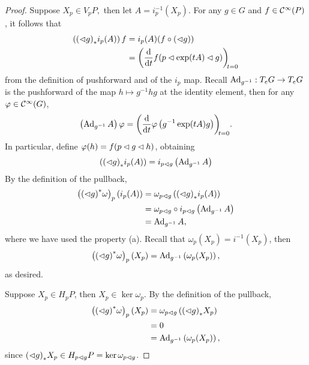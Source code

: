 \begin{proof}
    Suppose \(X_p \in V_pP,\) then let \(A = i^{-1}_p(X_p)\). For any \(g \in G\) and \(f \in \mathcal{C}^\infty(P)\), it follows that
    \begin{align*}
        \left(\pf{(\ract g)}{i_p(A)}\right)f &= i_p(A) (f \circ (\ract g))\\
                                             &= \diff*{f(p \ract \exp(tA) \ract g)}{t}[t=0]
    \end{align*}
    from the definition of pushforward and of the \(i_p\) map. Recall \(\operatorname{Ad}_{g^{-1}} : T_eG \to T_eG\) is the pushforward of the map \(h\mapsto g^{-1} h g\) at the identity element, then for any \(\varphi \in \mathcal{C}^\infty(G)\),
    \begin{equation*}
        \left(\Ad{g^{-1}}A\right)\varphi = \diff*{\varphi\left(g^{-1} \exp(tA) g\right)}{t}[t=0].
    \end{equation*}
    In particular, define \(\varphi(h) = f(p\mathbin{\vartriangleleft} g \mathbin{\vartriangleleft} h)\), obtaining
    \begin{equation*}
        \left({(\mathbin{\vartriangleleft} g)}_{\ast{}}{i_p(A)}\right) = i_{p \mathbin{\vartriangleleft} g}\left(\operatorname{Ad}_{g^{-1}}A\right)
    \end{equation*}
    By the definition of the pullback,
    \begin{align*}
        \left({(\mathbin{\vartriangleleft} g)}^{\ast}_{}{\omega}\right)_p \left(i_p(A)\right) &= \omega_{p\mathbin{\vartriangleleft} g}\left({(\mathbin{\vartriangleleft} g)}_{\ast{}}{i_p(A)}\right)\\
                                                                  &= \omega_{p\mathbin{\vartriangleleft} g} \circ i_{p\mathbin{\vartriangleleft} g}\left(\operatorname{Ad}_{g^{-1}}A\right)\\
                                                                  &= \operatorname{Ad}_{g^{-1}}A,
    \end{align*}
    where we have used the property (a). Recall that \(\omega_p(X_p) = i^{-1}(X_p)\), then
    \begin{equation*}
         \left({(\mathbin{\vartriangleleft} g)}^{\ast}_{}{\omega}\right)_p \left(X_p\right) = \operatorname{Ad}_{g^{-1}}\left(\omega_p(X_p)\right),
    \end{equation*}
    as desired.

    Suppose \(X_p \in H_pP\), then \(X_p \in \ker \omega_p\). By the definition of the pullback,
    \begin{align*}
        \left({(\mathbin{\vartriangleleft} g)}^{\ast}_{}{\omega}\right)_p \left(X_p\right) &= \omega_{p\mathbin{\vartriangleleft} g}\left({(\mathbin{\vartriangleleft} g)}_{\ast{}}{X_p}\right)\\
                                                               &= 0\\
                                                               &= \operatorname{Ad}_{g^{-1}}\left(\omega_p(X_p)\right),
    \end{align*}
    since \({(\mathbin{\vartriangleleft} g)}_{\ast{}}{X_p} \in H_{p\mathbin{\vartriangleleft} g}P = \ker \omega_{p\mathbin{\vartriangleleft} g}\).
\end{proof}
